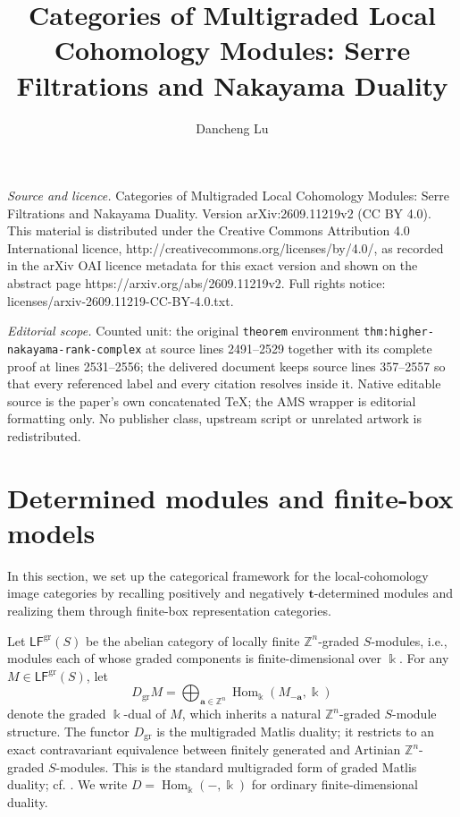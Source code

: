 \documentclass[10pt,a4paper]{amsart}
\newcommand{\Hom}{\operatorname{Hom}}
\newcommand{\LFgr}{\mathsf{LF}^{\mathrm{gr}}(S)}
\newcommand{\Dgr}{D_{\mathrm{gr}}}
\begin{document}
\title[Categories of Multigraded Local Cohomology Modules: Serre Fi]{Categories of Multigraded Local Cohomology Modules: Serre Filtrations and Nakayama Duality}
\author{Dancheng Lu}
\date{}
\maketitle
\noindent\emph{Source and licence.} Categories of Multigraded Local Cohomology Modules: Serre Filtrations and Nakayama Duality. Version arXiv:2609.11219v2 (CC BY 4.0). This material is distributed under the Creative Commons Attribution 4.0 International licence, http://creativecommons.org/licenses/by/4.0/, as recorded in the arXiv OAI licence metadata for this exact version and shown on the abstract page https://arxiv.org/abs/2609.11219v2. Full rights notice: licenses/arxiv-2609.11219-CC-BY-4.0.txt.\par\smallskip
\noindent\textit{Editorial scope.} Counted unit: the original \texttt{theorem} environment \texttt{thm:higher-nakayama-rank-complex} at source lines 2491--2529 together with its complete proof at lines 2531--2556; the delivered document keeps source lines 357--2557 so that every referenced label and every citation resolves inside it. Native editable source is the paper's own concatenated TeX; the AMS wrapper is editorial formatting only. No publisher class, upstream script or unrelated artwork is redistributed.
\section{Determined modules and finite-box models}\label{sec:determined}
In this section, we set up the categorical framework for the local-cohomology image categories by recalling positively and negatively $\mathbf t$-determined modules and realizing them through finite-box representation categories.

Let $\LFgr$ be the abelian category of locally finite $\mathbb Z^n$-graded
$S$-modules, i.e., modules each of whose graded components is finite-dimensional over
$\Bbbk$. For any $M\in\LFgr$, let
\[
\Dgr M=\bigoplus_{\mathbf a\in \mathbb Z^n}\Hom_\Bbbk(M_{-\mathbf a},\Bbbk)
\]
denote the graded $\Bbbk$-dual of $M$, which inherits a natural
$\mathbb Z^n$-graded $S$-module structure. The functor $\Dgr$ is the
multigraded Matlis duality; it restricts to an exact contravariant equivalence
between finitely generated and Artinian $\mathbb Z^n$-graded
$S$-modules.  This is the standard multigraded form of graded Matlis duality;
cf. \cite[Theorem~3.6.17]{BH}. We write
$D=\Hom_\Bbbk(-,\Bbbk)$ for ordinary finite-dimensional duality.
\end{document}
